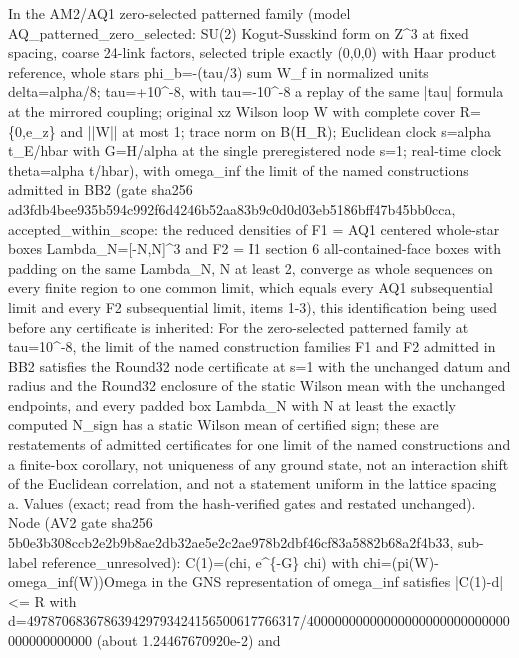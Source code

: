 \begin{gatequote}
In the AM2/AQ1 zero-selected patterned family (model
AQ\_patterned\_zero\_selected: SU(2) Kogut-Susskind form on
Z\textasciicircum{}3 at fixed spacing, coarse 24-link factors, selected triple
exactly (0,0,0) with Haar product reference, whole stars phi\_b=-(tau/3) sum
W\_f in normalized units delta=alpha/8; tau=+10\textasciicircum{}-8, with
tau=-10\textasciicircum{}-8 a replay of the same |tau| formula at the mirrored
coupling; original xz Wilson loop W with complete cover R=\{0,e\_z\} and ||W||
at most 1; trace norm on B(H\_R); Euclidean clock s=alpha t\_E/hbar with
G=H/alpha at the single preregistered node s=1; real-time clock theta=alpha
t/hbar), with omega\_inf the limit of the named constructions admitted in BB2
(gate sha256 ad3fdb4bee935b594c992f6d4246b52aa83b9c0d0d03eb5186bff47b45bb0cca,
accepted\_within\_scope: the reduced densities of F1 = AQ1 centered whole-star
boxes Lambda\_N=[-N,N]\textasciicircum{}3 and F2 = I1 section 6
all-contained-face boxes with padding on the same Lambda\_N, N at least 2,
converge as whole sequences on every finite region to one common limit, which
equals every AQ1 subsequential limit and every F2 subsequential limit, items
1-3), this identification being used before any certificate is inherited: For
the zero-selected patterned family at tau=10\textasciicircum{}-8, the limit of
the named construction families F1 and F2 admitted in BB2 satisfies the
Round32 node certificate at s=1 with the unchanged datum and radius and the
Round32 enclosure of the static Wilson mean with the unchanged endpoints, and
every padded box Lambda\_N with N at least the exactly computed N\_sign has a
static Wilson mean of certified sign; these are restatements of admitted
certificates for one limit of the named constructions and a finite-box
corollary, not uniqueness of any ground state, not an interaction shift of the
Euclidean correlation, and not a statement uniform in the lattice spacing a.
Values (exact; read from the hash-verified gates and restated unchanged). Node
(AV2 gate sha256
5b0e3b308ccb2e2b9b8ae2db32ae5e2c2ae978b2dbf46cf83a5882b68a2f4b33, sub-label
reference\_unresolved): C(1)=(chi, e\textasciicircum{}\{-G\} chi) with
chi=(pi(W)-omega\_inf(W))Omega in the GNS representation of omega\_inf
satisfies |C(1)-d| <= R with
d=4978\allowbreak{}706836\allowbreak{}786394\allowbreak{}297934\allowbreak{}241565\allowbreak{}006177\allowbreak{}66317/\allowbreak{}400000\allowbreak{}000000\allowbreak{}000000\allowbreak{}000000\allowbreak{}000000\allowbreak{}000000\allowbreak{}00000
(about 1.24467670920e-2) and

\end{gatequote}
